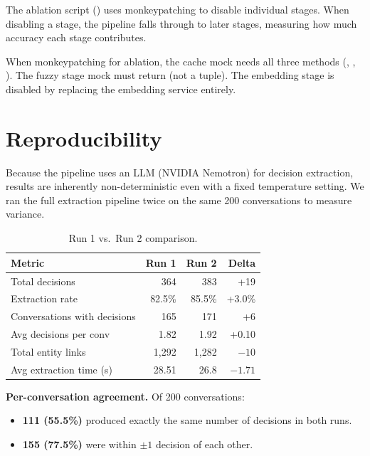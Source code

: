 The ablation script () uses
monkeypatching to disable individual stages.  When disabling a stage, the
pipeline falls through to later stages, measuring how much accuracy each
stage contributes.

\begin{warning}
When monkeypatching for ablation, the cache mock needs all three methods
(, ,
).  The fuzzy stage mock must return  (not a
tuple).  The embedding stage is disabled by replacing the embedding service
entirely.
\end{warning}


\section{Reproducibility}
\label{sec:eval-reproducibility}

Because the pipeline uses an LLM (NVIDIA Nemotron) for decision
extraction, results are inherently non-deterministic even with a fixed
temperature setting.  We ran the full extraction pipeline twice on the
same 200 conversations to measure variance.

\begin{table}[ht]
\centering
\caption{Run 1 vs.\ Run 2 comparison.}
\label{tab:reproducibility}
\begin{tabular}{l r r r}
\toprule
\textbf{Metric} & \textbf{Run 1} & \textbf{Run 2} & \textbf{Delta} \\
\midrule
Total decisions              & 364   & 383   & +19 \\
Extraction rate              & 82.5\%& 85.5\%& +3.0\% \\
Conversations with decisions & 165   & 171   & +6 \\
Avg decisions per conv       & 1.82  & 1.92  & +0.10 \\
Total entity links           & 1,292 & 1,282 & $-10$ \\
Avg extraction time (s)      & 28.51 & 26.8  & $-1.71$ \\
\bottomrule
\end{tabular}
\end{table}

\medskip\noindent\textbf{Per-conversation agreement.}  Of 200
conversations:

\begin{itemize}
    \item \textbf{111 (55.5\%)} produced exactly the same number of
          decisions in both runs.
    \item \textbf{155 (77.5\%)} were within $\pm 1$ decision of each
          other.
\end{itemize}

